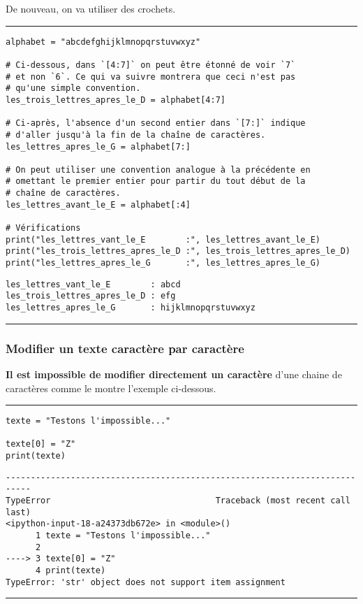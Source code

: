 De nouveau, on va utiliser des crochets.


\bigskip
{\hrule height .5mm}
\begin{verbatim}
alphabet = "abcdefghijklmnopqrstuvwxyz"

# Ci-dessous, dans `[4:7]` on peut être étonné de voir `7`
# et non `6`. Ce qui va suivre montrera que ceci n'est pas
# qu'une simple convention.
les_trois_lettres_apres_le_D = alphabet[4:7]

# Ci-après, l'absence d'un second entier dans `[7:]` indique
# d'aller jusqu'à la fin de la chaîne de caractères.
les_lettres_apres_le_G = alphabet[7:]

# On peut utiliser une convention analogue à la précédente en
# omettant le premier entier pour partir du tout début de la
# chaîne de caractères.
les_lettres_avant_le_E = alphabet[:4]

# Vérifications
print("les_lettres_vant_le_E        :", les_lettres_avant_le_E)
print("les_trois_lettres_apres_le_D :", les_trois_lettres_apres_le_D)
print("les_lettres_apres_le_G       :", les_lettres_apres_le_G)
\end{verbatim}
 \color{ForestGreen}
\vspace{-1.5em}
\begin{verbatim}
les_lettres_vant_le_E        : abcd
les_trois_lettres_apres_le_D : efg
les_lettres_apres_le_G       : hijklmnopqrstuvwxyz
\end{verbatim} \color{Black}
{\hrule height .5mm}
\bigskip


\subsubsection{Modifier un texte caractère par caractère}

\textbf{Il est impossible de modifier directement un caractère} d'une chaine de caractères comme le montre l'exemple ci-dessous.


\bigskip
{\hrule height .5mm}
\begin{verbatim}
texte = "Testons l'impossible..."

texte[0] = "Z"
print(texte)
\end{verbatim}
 \color{ForestGreen}
\vspace{-1.5em}
\begin{verbatim}
---------------------------------------------------------------------------
TypeError                                 Traceback (most recent call last)
<ipython-input-18-a24373db672e> in <module>()
      1 texte = "Testons l'impossible..."
      2 
----> 3 texte[0] = "Z"
      4 print(texte)
TypeError: 'str' object does not support item assignment
\end{verbatim} \color{Black}
{\hrule height .5mm}
\bigskip


